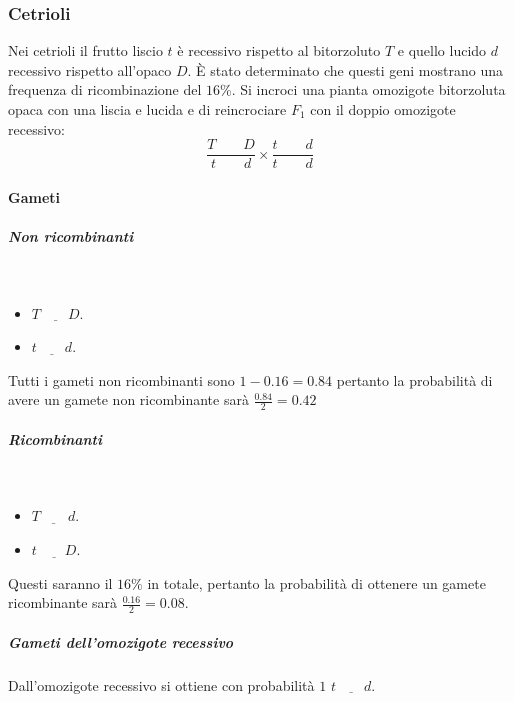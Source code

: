 			\subsubsection{Cetrioli}
			Nei cetrioli il frutto liscio $t$ \`e recessivo rispetto al bitorzoluto $T$ e quello lucido $d$ recessivo rispetto all'opaco $D$.
			\`E stato determinato che questi geni mostrano una frequenza di ricombinazione del $16\%$.
			Si incroci una pianta omozigote bitorzoluta opaca con una liscia e lucida e di reincrociare $F_1$ con il doppio omozigote recessivo:
			\[\dfrac{T\quad\quad D}{t\quad\quad d}\times\dfrac{t\quad\quad d}{t\quad\quad d}\]

				\paragraph{Gameti}

					\subparagraph{Non ricombinanti}\mbox{}\\
					\begin{multicols}{2}
						\begin{itemize}
							\item $\underline{T\quad\quad D}$.
							\item $\underline{t\quad\quad d}$.
						\end{itemize}
					\end{multicols}
					Tutti i gameti non ricombinanti sono $1-0.16=0.84$ pertanto la probabilit\`a di avere un gamete non ricombinante sar\`a $\frac{0.84}{2}=0.42$
					
					\subparagraph{Ricombinanti}\mbox{}\\
					\begin{multicols}{2}
						\begin{itemize}
							\item $\underline{T\quad\quad d}$.
							\item $\underline{t\quad\quad D}$.
						\end{itemize}
					\end{multicols}
					Questi saranno il $16\%$ in totale, pertanto la probabilit\`a di ottenere un gamete ricombinante sar\`a $\frac{0.16}{2}=0.08$.
		
					\subparagraph{Gameti dell'omozigote recessivo}
					Dall'omozigote recessivo si ottiene con probabilit\`a $1$ $\underline{t\quad\quad d}$.

